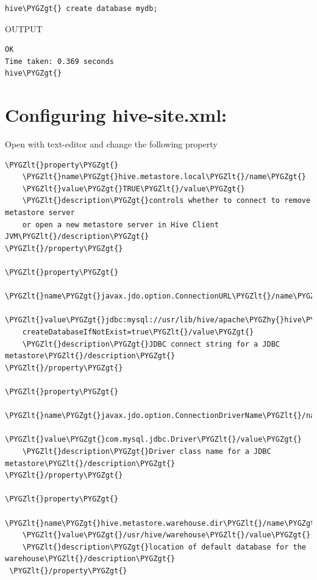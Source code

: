 \documentclass[a4paper,12pt,oneside]{sphinxmanual}
\def\PYGZus{\char`\_}
\def\PYGZlt{\char`\<}
\def\PYGZgt{\char`\>}
\def\PYGZhy{\char`\-}
\begin{document}
\begin{Verbatim}[commandchars=\\\{\}]
hive\PYGZgt{} create database mydb;
\end{Verbatim}

OUTPUT

\begin{Verbatim}[commandchars=\\\{\}]
OK
Time taken: 0.369 seconds
hive\PYGZgt{}
\end{Verbatim}


\section{Configuring hive-site.xml:}
\label{document:configuring-hive-site-xml}
Open with text-editor and change the following property

\begin{Verbatim}[commandchars=\\\{\}]
\PYGZlt{}property\PYGZgt{}
    \PYGZlt{}name\PYGZgt{}hive.metastore.local\PYGZlt{}/name\PYGZgt{}
    \PYGZlt{}value\PYGZgt{}TRUE\PYGZlt{}/value\PYGZgt{}
    \PYGZlt{}description\PYGZgt{}controls whether to connect to remove metastore server
    or open a new metastore server in Hive Client JVM\PYGZlt{}/description\PYGZgt{}
\PYGZlt{}/property\PYGZgt{}

\PYGZlt{}property\PYGZgt{}
    \PYGZlt{}name\PYGZgt{}javax.jdo.option.ConnectionURL\PYGZlt{}/name\PYGZgt{}
    \PYGZlt{}value\PYGZgt{}jdbc:mysql://usr/lib/hive/apache\PYGZhy{}hive\PYGZhy{}0.13.0\PYGZhy{}bin/metastore\PYGZus{}db?
    createDatabaseIfNotExist=true\PYGZlt{}/value\PYGZgt{}
    \PYGZlt{}description\PYGZgt{}JDBC connect string for a JDBC metastore\PYGZlt{}/description\PYGZgt{}
\PYGZlt{}/property\PYGZgt{}

\PYGZlt{}property\PYGZgt{}
    \PYGZlt{}name\PYGZgt{}javax.jdo.option.ConnectionDriverName\PYGZlt{}/name\PYGZgt{}
    \PYGZlt{}value\PYGZgt{}com.mysql.jdbc.Driver\PYGZlt{}/value\PYGZgt{}
    \PYGZlt{}description\PYGZgt{}Driver class name for a JDBC metastore\PYGZlt{}/description\PYGZgt{}
\PYGZlt{}/property\PYGZgt{}

\PYGZlt{}property\PYGZgt{}
    \PYGZlt{}name\PYGZgt{}hive.metastore.warehouse.dir\PYGZlt{}/name\PYGZgt{}
    \PYGZlt{}value\PYGZgt{}/usr/hive/warehouse\PYGZlt{}/value\PYGZgt{}
    \PYGZlt{}description\PYGZgt{}location of default database for the warehouse\PYGZlt{}/description\PYGZgt{}
 \PYGZlt{}/property\PYGZgt{}
\end{Verbatim}
\end{document}
